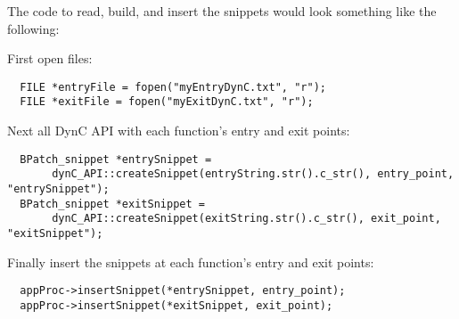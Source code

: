 \documentclass{article}
\begin{document}

\noindent The code to read, build, and insert the snippets would look something like the following:

\noindent First open files:
\begin{lstlisting}
  FILE *entryFile = fopen("myEntryDynC.txt", "r");
  FILE *exitFile = fopen("myExitDynC.txt", "r");
\end{lstlisting}

\noindent Next all DynC API with each function's entry and exit points:
\begin{lstlisting}
  BPatch_snippet *entrySnippet = 
       dynC_API::createSnippet(entryString.str().c_str(), entry_point, "entrySnippet");
  BPatch_snippet *exitSnippet = 
       dynC_API::createSnippet(exitString.str().c_str(), exit_point, "exitSnippet");
\end{lstlisting}

\noindent Finally insert the snippets at each function's entry and exit points:
\begin{lstlisting}
  appProc->insertSnippet(*entrySnippet, entry_point);
  appProc->insertSnippet(*exitSnippet, exit_point);
\end{lstlisting}

\begin{comment}
\begin{lstlisting}
/*** Create Snippet ***/
// build entryString
std::stringstream entryString;
entryString << "static int intCounter;" << endl;
entryString << "printf(\"Entering %s, which has been called %d times.\\n\"";
entryString << ",dyninst`function_name, intCounter);";

// call to DynC API
BPatch_snippet *entrySnippet = 
       dynC_API::createSnippet(entryString.str().c_str(), entryPoint, "entrySnippet");

// build exitString
std::stringstream exitString;
exitString << "printf(\"Exiting %s.\\n\", dyninst`function_name);";

// call to DynC API
BPatch_snippet *exitSnippet = 
       dynC_API::createSnippet(exitString.str().c_str(), app, "exitSnippet");
/*** Finish Snippet ***/

// find all entry and exit points
std::vector<BPatch_point *> * entry_points = (*functions)[0]->findPoint(BPatch_entry);
std::vector<BPatch_point *> * exit_points = (*functions)[0]->findPoint(BPatch_exit);

for(unsigned int i = 1; i < functions->size(); i++){
  entry_points->push_back((*(*functions)[i]->findPoint(BPatch_entry))[0]);
  exit_points->push_back((*(*functions)[i]->findPoint(BPatch_exit))[0]);
}

// insert Snippets
appProc->insertSnippet(*entrySnippet, entry_points);
appProc->insertSnippet(*exitSnippet, exit_points);
  
//run mutatee
appProc->continueExecution();

\end{lstlisting}
\end{comment}
\end{document}

